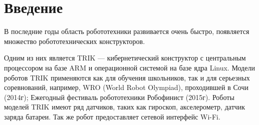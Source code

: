 \documentclass[14pt]{matmex-diploma-custom.cls}
\begin{document}
\maketitle
\tableofcontents
\section*{Введение}

В последние годы область робототехники развивается очень быстро, появляется множество робототехнических конструкторов.


Одним из них является TRIK \cite{trik} --- кибернетический конструктор с центральным процессором на базе ARM и операционной системой на базе ядра Linux. Модели роботов TRIK применяются как для обучения школьников, так и для серьезных соревнований, например, WRO (World Robot Olympiad), проходившей в Сочи (2014г); Ежегодный фестиваль робототехники Робофинист (2015г). Роботы моделей TRIK имеют ряд датчиков, таких как гироскоп, акселерометр, датчик заряда батареи. Так же робот предоставляет сетевой интерфейс Wi-Fi.
\end{document}
